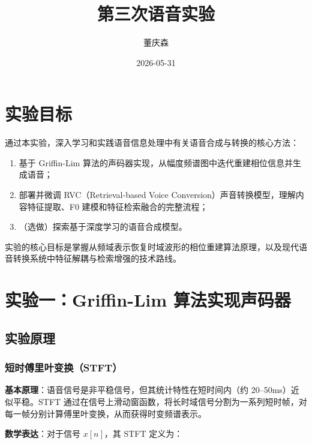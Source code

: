 \documentclass[
  english,
  letterpaper,
  DIV=11,
  numbers=noendperiod]{scrartcl}
\title{第三次语音实验}
\author{董庆森}
\date{2026-05-31}
\providecommand{\tightlist}{%
  \setlength{\itemsep}{0pt}\setlength{\parskip}{0pt}}
\renewcommand*\contentsname{Table of contents}
\newcommand\contentsname{Table of contents}
\begin{document}
\maketitle

\renewcommand*\contentsname{Table of contents}
{
\setcounter{tocdepth}{3}
\tableofcontents
}

\section{实验目标}\label{ux5b9eux9a8cux76eeux6807}

通过本实验，深入学习和实践语音信息处理中有关语音合成与转换的核心方法：

\begin{enumerate}
\def\labelenumi{\arabic{enumi}.}
\tightlist
\item
  基于 Griffin-Lim
  算法的声码器实现，从幅度频谱图中迭代重建相位信息并生成语音；
\item
  部署并微调 RVC（Retrieval-based Voice
  Conversion）声音转换模型，理解内容特征提取、F0
  建模和特征检索融合的完整流程；
\item
  （选做）探索基于深度学习的语音合成模型。
\end{enumerate}

实验的核心目标是掌握从频域表示恢复时域波形的相位重建算法原理，以及现代语音转换系统中特征解耦与检索增强的技术路线。

\section{实验一：Griffin-Lim
算法实现声码器}\label{ux5b9eux9a8cux4e00griffin-lim-ux7b97ux6cd5ux5b9eux73b0ux58f0ux7801ux5668}

\subsection{实验原理}\label{ux5b9eux9a8cux539fux7406}

\subsubsection{短时傅里叶变换（STFT）}\label{ux77edux65f6ux5085ux91ccux53f6ux53d8ux6362stft}

\textbf{基本原理}：语音信号是非平稳信号，但其统计特性在短时间内（约
20--50ms）近似平稳。STFT
通过在信号上滑动窗函数，将长时域信号分割为一系列短时帧，对每一帧分别计算傅里叶变换，从而获得时变频谱表示。

\textbf{数学表达}：对于信号 \(x[n]\)，其 STFT 定义为：
\end{document}
